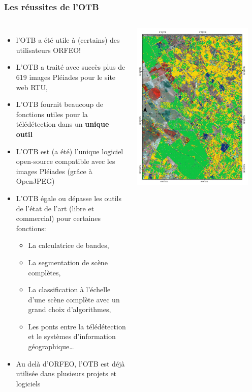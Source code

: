 \documentclass[8pt]{beamer}
\begin{document}
\begin{frame}
\frametitle{Les réussites de l'OTB}
\vspace{-0.5cm}
\begin{columns}
\begin{itemize}
\item l'OTB a été utile à (certains) des utilisateurs ORFEO!
\item L'OTB a traité avec succès plus de 619 images Pléiades pour le site web RTU,
\item L'OTB fournit beaucoup de fonctions utiles pour la télédétection dans un \textbf{unique outil}
\item L'OTB est (a été) l'unique logiciel open-source compatible avec les images Pléiades (grâce à OpenJPEG)
\item L'OTB égale ou dépasse les outils de l'état de l'art (libre et commercial) pour certaines fonctions:
\begin{itemize}
\item La calculatrice de bandes,
\item La segmentation de scène complètes,
\item La classification à l'échelle d'une scène complète avec un grand choix d'algorithmes,
\item Les ponts entre la télédétection et le systèmes d'information géographique\ldots
\end{itemize}
\item Au delà d'ORFEO, l'OTB est déjà utilisée dans plusieurs projets et logiciels
\end{itemize}
\includegraphics[width=0.9\textwidth]{images/resultats_ird.png}\\

\end{columns}
\end{frame}
\end{document}
